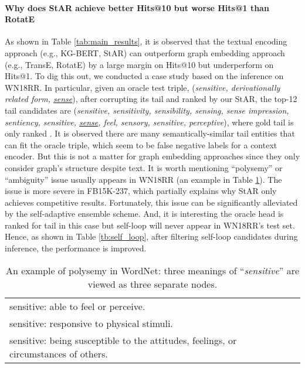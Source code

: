 \documentclass[sigconf]{acmart}
\begin{document}
\paragraph{Why does StAR achieve better Hits@10 but worse Hits@1 than RotatE}
As shown in Table \ref{tab:main_results}, it is observed that the textual encoding approach (e.g., KG-BERT, StAR) can outperform graph embedding approach (e.g., TransE, RotatE) by a large margin on Hits@10 but underperform on Hits@1. 
To dig this out, we conducted a case study based on the inference on WN18RR. 
In particular, given an oracle test triple, (\textit{sensitive, derivationally related form, \underline{sense}}), after corrupting its tail and ranked by our StAR, the top-12 tail candidates are (\textit{sensitive, sensitivity, sensibility, sensing, sense impression, sentiency, sensitive, \underline{sense}, feel, sensory, sensitive, perceptive}), where gold tail is only ranked . It is observed there are many semantically-similar tail entities that can fit the oracle triple, which seem to be false negative labels for a context encoder.
But this is not a matter for graph embedding approaches since they only consider graph's structure despite text. 
It is worth mentioning ``polysemy'' or ``ambiguity'' issue usually appears in WN18RR (an example in Table \ref{tb:example}). The issue is more severe in FB15K-237, which partially explains why StAR only achieves competitive results. 
Fortunately, this issue can be significantly alleviated by the self-adaptive ensemble scheme. 
And, it is interesting the oracle head is ranked  for tail in this case but self-loop will never appear in WN18RR's test set. Hence, as shown in Table \ref{tb:self_loop}, after filtering self-loop candidates during inference, the performance is improved. 


\begin{table}[t] \small
    \caption{\small An example of polysemy in WordNet: three meanings of ``\textit{sensitive}'' are viewed as three separate nodes.}
	\centering
	\begin{tabular}{p{}}
		\hline
		 sensitive: able to feel or perceive. \\ sensitive: responsive to physical stimuli. \\ sensitive: being susceptible to the attitudes, feelings, or circumstances of others. \\\hline
	\end{tabular}
	\label{tb:example}
\end{table}
\end{document}
